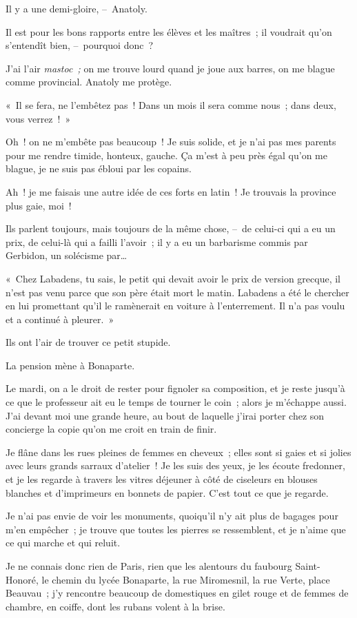 \documentclass[french,twoside]{book} %
\begin{document}
Il y a une demi-gloire, – Anatoly.\par
Il est pour les bons rapports entre les élèves et les maîtres ; il voudrait qu’on s’entendît bien, – pourquoi donc ?\par
J’ai l’air \emph{mastoc ;} on me trouve lourd quand je joue aux barres, on me blague comme provincial. Anatoly me protège.\par
« Il se fera, ne l’embêtez pas ! Dans un mois il sera comme nous ; dans deux, vous verrez ! »\par
Oh ! on ne m’embête pas beaucoup ! Je suis solide, et je n’ai pas mes parents pour me rendre timide, honteux, gauche. Ça m’est à peu près égal qu’on me blague, je ne suis pas ébloui par les copains.\par
Ah ! je me faisais une autre idée de ces forts en latin ! Je trouvais la province plus gaie, moi !\par
Ils parlent toujours, mais toujours de la même chose, – de celui-ci qui a eu un prix, de celui-là qui a failli l’avoir ; il y a eu un barbarisme commis par Gerbidon, un solécisme par…\par
« Chez Labadens, tu sais, le petit qui devait avoir le prix de version grecque, il n’est pas venu parce que son père était mort le matin. Labadens a été le chercher en lui promettant qu’il le ramènerait en voiture à l’enterrement. Il n’a pas voulu et a continué à pleurer. »\par
Ils ont l’air de trouver ce petit stupide.\par
La pension mène à Bonaparte.\par
Le mardi, on a le droit de rester pour fignoler sa composition, et je reste jusqu’à ce que le professeur ait eu le temps de tourner le coin ; alors je m’échappe aussi. J’ai devant moi une grande heure, au bout de laquelle j’irai porter chez son concierge la copie qu’on me croit en train de finir.\par
Je flâne dans les rues pleines de femmes en cheveux ; elles sont si gaies et si jolies avec leurs grands sarraux d’atelier ! Je les suis des yeux, je les écoute fredonner, et je les regarde à travers les vitres déjeuner à côté de ciseleurs en blouses blanches et d’imprimeurs en bonnets de papier. C’est tout ce que je regarde.\par
Je n’ai pas envie de voir les monuments, quoiqu’il n’y ait plus de bagages pour m’en empêcher ; je trouve que toutes les pierres se ressemblent, et je n’aime que ce qui marche et qui reluit.\par
Je ne connais donc rien de Paris, rien que les alentours du faubourg Saint-Honoré, le chemin du lycée Bonaparte, la rue Miromesnil, la rue Verte, place Beauvau ; j’y rencontre beaucoup de domestiques en gilet rouge et de femmes de chambre, en coiffe, dont les rubans volent à la brise.\par
\end{document}

